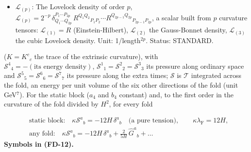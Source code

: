\documentclass[
  10pt,
]{article}
\begin{document}
\begin{itemize}
  scalar curvature \(R = g^{MN}R_{MN}\); with frame indices
  \(R^{(a)(b)}{}_{(c)(d)}\) its frame components,
  \(R^{(a)(b)}{}_{(a)(b)}\) (no sum) the sectional curvature of the
  frame plane \((a, b)\). Unit: 1/length\(^2\). Status: STANDARD.
\item
  \(\mathcal{L}_{(p)}\): The Lovelock density of order \(p\),
  \(\mathcal{L}_{(p)} = 2^{-p}\,\delta^{P_1\cdots P_{2p}}_{Q_1\cdots Q_{2p}}\,R^{Q_1Q_2}{}_{P_1P_2}\cdots R^{Q_{2p-1}Q_{2p}}{}_{P_{2p-1}P_{2p}}\),
  a scalar built from \(p\) curvature tensors: \(\mathcal{L}_{(1)} = R\)
  (Einstein-Hilbert), \(\mathcal{L}_{(2)}\) the Gauss-Bonnet density,
  \(\mathcal{L}_{(3)}\) the cubic Lovelock density. Unit:
  1/length\(^{2p}\). Status: STANDARD.
\end{itemize}

(\(K = K^c{}_c\) the trace of the extrinsic curvature), with
\(\mathcal{S}^4{}_4 = -(\text{its energy density})\),
\(\mathcal{S}^1{}_1 = \mathcal{S}^2{}_2 = \mathcal{S}^3{}_3\) its
pressure along ordinary space and
\(\mathcal{S}^5{}_5 = \mathcal{S}^6{}_6 = \mathcal{S}^7{}_7\) its
pressure along the extra times; \(\mathcal{S}\) is \(\mathcal{T}\)
integrated across the fold, an energy per unit volume of the six other
directions of the fold (unit GeV\(^7\)). For the static block (\(a_4\)
and \(b_4\) constant) and, to the first order in the curvature of the
fold divided by \(H^2\), for every fold

\[
\begin{aligned}
&\text{static block:}\quad \kappa\mathcal{S}^a{}_b = -12H\,\delta^a{}_b\quad\text{(a pure tension)},\qquad \kappa\lambda_{\mathrm{F}} = 12H,\\
&\text{any fold:}\quad \kappa\mathcal{S}^a{}_b = -12H\,\delta^a{}_b + \frac{2}{5H}\,\hat G^a{}_b + \dots
\end{aligned} \tag{FD-12}
\] \textbf{Symbols in (FD-12).}
\end{document}

